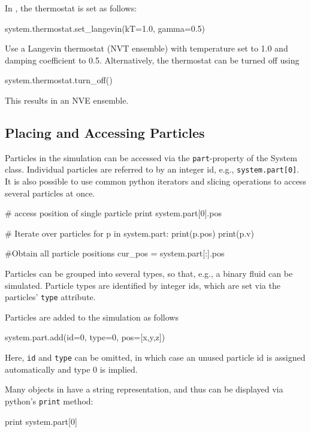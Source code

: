 \documentclass[
paper=a4,                       %
fontsize=11pt,                  %
twoside,                        %
footsepline,                    %
headsepline,                    %
headinclude=false,              %
footinclude=false,              %
pagesize,                       %
]{scrartcl}
\begin{document}
In \es{}, the thermostat is set as follows:
{\small\vspace{0,2cm}
\begin{pypresso}
system.thermostat.set_langevin(kT=1.0, gamma=0.5)
\end{pypresso}}\vspace{0,2cm}
\noindent Use a Langevin thermostat (NVT ensemble) with temperature set to 1.0 and damping coefficient to 0.5. Alternatively, the thermostat can be turned off using
{\small\vspace{0,2cm}
\begin{pypresso}
system.thermostat.turn_off()
\end{pypresso}}\vspace{0,2cm}
\noindent This results in an NVE ensemble.


\subsection{Placing and Accessing Particles}

Particles in the simulation can be accessed via the \texttt{part}-property of the System class. Individual particles are referred to by an integer id, e.g., \texttt{system.part[0]}. It is also possible to use common python iterators and slicing operations to access several particles at once.
\begin{pypresso}
# access position of single particle
print system.part[0].pos

# Iterate over particles
for p in system.part:
    print(p.pos)
    print(p.v)

#Obtain all particle positions
cur_pos = system.part[:].pos
\end{pypresso}
Particles can be grouped into several types, so that, e.g., a binary fluid can be simulated. Particle types are identified by integer ids, which are set via the particles' \texttt{type} attribute. 

Particles are added to the simulation as follows
\begin{pypresso}
system.part.add(id=0, type=0, pos=[x,y,z])
\end{pypresso}\vspace{0,2cm}
Here, \texttt{id} and \texttt{type} can be omitted, in which case an unused particle
id is assigned automatically and type 0 is implied.

Many objects in \es{} have a string representation, and thus can be displayed via python's \texttt{print} method:
\begin{pypresso}
print system.part[0]
\end{pypresso}\vspace{0,2cm}
\end{document}
